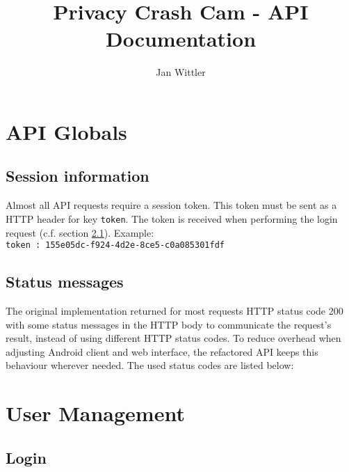 \documentclass{report}
\begin{document}
\title{Privacy Crash Cam - API Documentation}
\author{Jan Wittler}
\maketitle

\chapter{API Globals}

\section{Session information}

Almost all API requests require a session token. This token must be sent as a HTTP header for key \texttt{token}. The token is received when performing the login request (c.f. section \ref{Login}). Example:\\
\texttt{token : 155e05dc-f924-4d2e-8ce5-c0a085301fdf}\\

\section{Status messages}

The original implementation returned for most requests HTTP status code 200 with some status messages in the HTTP body to communicate the request's result, instead of using different HTTP status codes. To reduce overhead when adjusting Android client and web interface, the refactored API keeps this behaviour wherever needed. The used status codes are listed below:


\chapter{User Management}

\section{Login} \label{Login}
\end{document}
